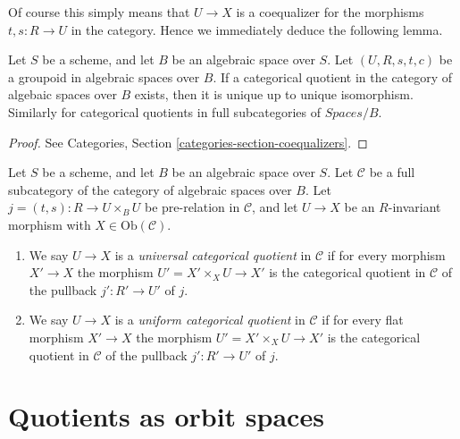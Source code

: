 \noindent
Of course this simply means that $U \to X$ is a coequalizer for the
morphisms $t, s : R \to U$ in the category. Hence we immediately
deduce the following lemma.

\begin{lemma}
\label{lemma-categorical-unique}
Let $S$ be a scheme, and let $B$ be an algebraic space over $S$.
Let $(U, R, s, t, c)$ be a groupoid in algebraic spaces over $B$.
If a categorical quotient in the category of algebaic spaces
over $B$ exists, then it is unique up to unique isomorphism.
Similarly for categorical quotients in full subcategories of
$\textit{Spaces}/B$.
\end{lemma}

\begin{proof}
See Categories, Section \ref{categories-section-coequalizers}.
\end{proof}

\begin{definition}
\label{definition-universal-categorical}
Let $S$ be a scheme, and let $B$ be an algebraic space over $S$.
Let $\mathcal{C}$ be a full subcategory of the category of algebraic
spaces over $B$. Let $j = (t, s) : R \to U \times_B U$ be pre-relation in
$\mathcal{C}$, and let $U \to X$ be an $R$-invariant morphism with
$X \in \text{Ob}(\mathcal{C})$.
\begin{enumerate}
\item We say $U \to X$ is a {\it universal categorical quotient}
in $\mathcal{C}$ if for every morphism $X' \to X$ the morphism
$U' = X' \times_X U \to X'$ is the categorical quotient in $\mathcal{C}$
of the pullback $j' : R' \to U'$ of $j$.
\item We say $U \to X$ is a {\it uniform categorical quotient}
in $\mathcal{C}$ if for every flat morphism $X' \to X$ the morphism
$U' = X' \times_X U \to X'$ is the categorical quotient in $\mathcal{C}$
of the pullback $j' : R' \to U'$ of $j$.
\end{enumerate}
\end{definition}




\section{Quotients as orbit spaces}
\label{section-orbits}

